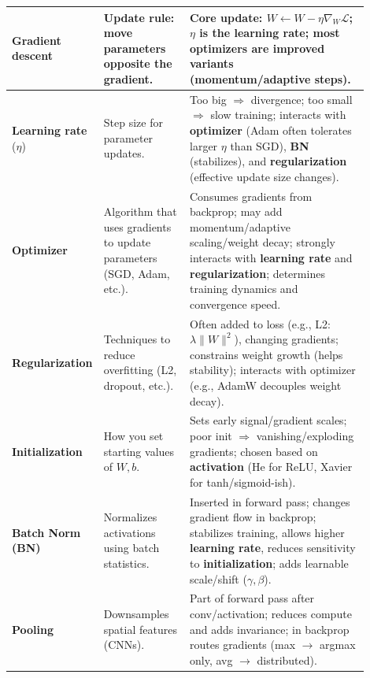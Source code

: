 \documentclass[11pt]{article}
\begin{document}
\begin{longtable}{|p{0.16\linewidth}|p{0.24\linewidth}|p{0.50\linewidth}|}
\textbf{Gradient descent} &
Update rule: move parameters opposite the gradient. &
Core update: $W \leftarrow W - \eta \nabla_W \mathcal{L}$; $\eta$ is the \textbf{learning rate}; most \textbf{optimizers} are improved variants (momentum/adaptive steps). \\
\hline

\textbf{Learning rate} ($\eta$) &
Step size for parameter updates. &
Too big $\Rightarrow$ divergence; too small $\Rightarrow$ slow training; interacts with \textbf{optimizer} (Adam often tolerates larger $\eta$ than SGD), \textbf{BN} (stabilizes), and \textbf{regularization} (effective update size changes). \\
\hline

\textbf{Optimizer} &
Algorithm that uses gradients to update parameters (SGD, Adam, etc.). &
Consumes gradients from backprop; may add momentum/adaptive scaling/weight decay; strongly interacts with \textbf{learning rate} and \textbf{regularization}; determines training dynamics and convergence speed. \\
\hline

\textbf{Regularization} &
Techniques to reduce overfitting (L2, dropout, etc.). &
Often added to loss (e.g., L2: $\lambda \lVert W\rVert^2$), changing gradients; constrains weight growth (helps stability); interacts with optimizer (e.g., AdamW decouples weight decay). \\
\hline

\textbf{Initialization} &
How you set starting values of $W,b$. &
Sets early signal/gradient scales; poor init $\Rightarrow$ vanishing/exploding gradients; chosen based on \textbf{activation} (He for ReLU, Xavier for tanh/sigmoid-ish). \\
\hline

\textbf{Batch Norm (BN)} &
Normalizes activations using batch statistics. &
Inserted in forward pass; changes gradient flow in backprop; stabilizes training, allows higher \textbf{learning rate}, reduces sensitivity to \textbf{initialization}; adds learnable scale/shift ($\gamma,\beta$). \\
\hline

\textbf{Pooling} &
Downsamples spatial features (CNNs). &
Part of forward pass after conv/activation; reduces compute and adds invariance; in backprop routes gradients (max $\rightarrow$ argmax only, avg $\rightarrow$ distributed). \\
\hline

\end{longtable}
\end{document}
